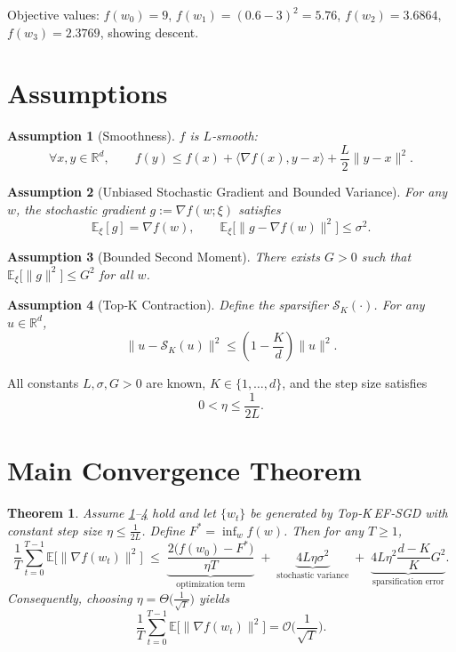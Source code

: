 \documentclass[11pt]{article}
\newtheorem{theorem}{Theorem}[section]
\newtheorem{assumption}{Assumption}[section]
\begin{document}
Objective values: $f(w_{0})=9$, $f(w_{1})=(0.6-3)^{2}=5.76$, $f(w_{2})=3.6864$, $f(w_{3})=2.3769$, showing descent.

\newpage
\section*{Assumptions}
\begin{assumption}[Smoothness]\label{ass:smooth}
$f$ is $L$‑smooth:
\[
\forall x,y\in\mathbb{R}^{d},\qquad
f(y)\le f(x)+\langle\nabla f(x),y-x\rangle+\frac{L}{2}\|y-x\|^{2}.
\]
\end{assumption}
\begin{assumption}[Unbiased Stochastic Gradient and Bounded Variance]\label{ass:unbiased}
For any $w$, the stochastic gradient $g:=\nabla f(w;\xi)$ satisfies
\[
\mathbb{E}_{\xi}[g]=\nabla f(w),\qquad
\mathbb{E}_{\xi}\big[\|g-\nabla f(w)\|^{2}\big]\le\sigma^{2}.
\]
\end{assumption}
\begin{assumption}[Bounded Second Moment]\label{ass:bounded}
There exists $G>0$ such that $\mathbb{E}_{\xi}\big[\|g\|^{2}\big]\le G^{2}$ for all $w$.
\end{assumption}
\begin{assumption}[Top‑K Contraction]\label{ass:topk}
Define the sparsifier $\mathcal{S}_{K}(\cdot)$. For any $u\in\mathbb{R}^{d}$,
\[
\|u-\mathcal{S}_{K}(u)\|^{2}\le\left(1-\frac{K}{d}\right)\|u\|^{2}.
\]
\end{assumption}
All constants $L,\sigma,G>0$ are known, $K\in\{1,\dots,d\}$, and the step size satisfies
\[
0<\eta\le \frac{1}{2L}.
\]

\section*{Main Convergence Theorem}
\begin{theorem}\label{thm:main}
Assume \ref{ass:smooth}–\ref{ass:topk} hold and let $\{w_{t}\}$ be generated by Top‑K EF‑SGD with constant step size $\eta\le\frac{1}{2L}$. Define $F^{*}= \inf_{w}f(w)$. Then for any $T\ge1$,
\[
\frac{1}{T}\sum_{t=0}^{T-1}\mathbb{E}\big[\|\nabla f(w_{t})\|^{2}\big]
\;\le\;
\underbrace{\frac{2\big(f(w_{0})-F^{*}\big)}{\eta T}}_{\text{optimization term}}
\;+\;
\underbrace{4L\eta\sigma^{2}}_{\text{stochastic variance}}
\;+\;
\underbrace{4L\eta^{2}\frac{d-K}{K}G^{2}}_{\text{sparsification error}}.
\]
Consequently, choosing $\eta= \Theta\!\big(\frac{1}{\sqrt{T}}\big)$ yields
\[
\frac{1}{T}\sum_{t=0}^{T-1}\mathbb{E}\big[\|\nabla f(w_{t})\|^{2}\big]=\mathcal{O}\!\Big(\frac{1}{\sqrt{T}}\Big).
\]
\end{theorem}
\end{document}
